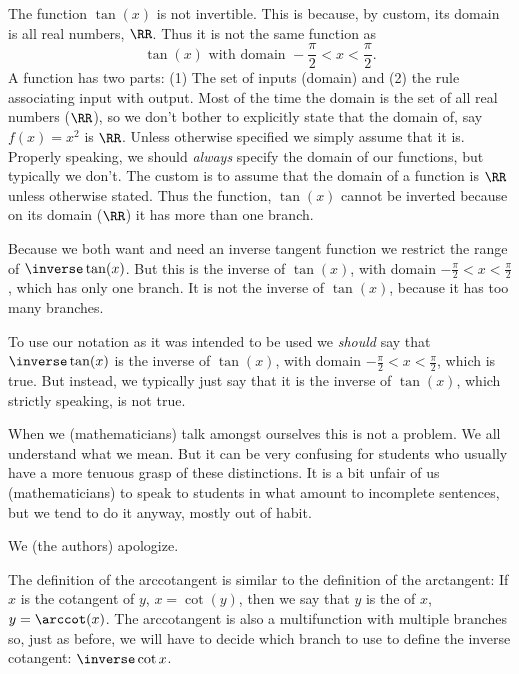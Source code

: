 \begin{Digression}
  The function $\tan(x)$ is not invertible. This is because, by
  custom, its domain is all real numbers, $\RR$. Thus it is
  \alert{not} the same function as
  $$\tan(x) \text{ with domain } -\frac{\pi}{2}\lt{}x\lt{}\frac{\pi}{2}.$$  A
  function has two parts: (1) The set of inputs (domain) and (2) the
  rule associating input with output. Most of the time the domain is
  the set of all real numbers ($\RR$), so we don't bother to
  explicitly state that the domain of, say $f(x)=x^2$ is
  $\RR${}. Unless otherwise specified we simply assume that it is.
  Properly speaking, we should \emph{always} specify the domain of our
  functions, but typically we don't. The custom is to assume that the
  domain of a function is $\RR$ unless otherwise stated.
  Thus the  function, $\tan(x)$ cannot be inverted because on its
  domain ($\RR$) it has more than
  one branch.

  Because we both want and need an inverse tangent function we
  restrict the range of $\inverse\tan(x)$. But this is the inverse of
  $\tan(x)$, with domain $-\frac{\pi}{2}\lt{}x\lt{}\frac{\pi}{2}$,
  which has only one branch. It is \alert{not} the inverse of
  $\tan(x)$, because it has too many branches.

  To use our notation as it was intended to be used we \emph{should}
  say that $\inverse\tan(x)$ is the inverse of $\tan(x)$, with domain
  $-\frac{\pi}{2}\lt{}x\lt{}\frac{\pi}{2}$, which is true. But instead, we
  typically just say that it is the inverse of $\tan(x)$, which
  strictly speaking, is not true. 


  When we (mathematicians) talk amongst ourselves this is not a
  problem. We all understand what we mean. But it can be very
  confusing for students who usually have a more tenuous grasp of
  these distinctions.  It is a bit unfair of us (mathematicians) to
  speak to students in what amount to incomplete sentences, but we
  tend to do it anyway, mostly out of habit.

  We (the authors) apologize.
\end{Digression}

The definition of the arccotangent is similar to the definition of the
arctangent: If $x$ is the cotangent of $y$, $x=\cot(y)$, then we say
that $y$ is the  of $x$, $y=\arccot(x)$. The
arccotangent is also a multifunction with multiple branches so, just
as before, we will have to decide which branch to use to define the
inverse cotangent: $\inverse\cot{x}$.


